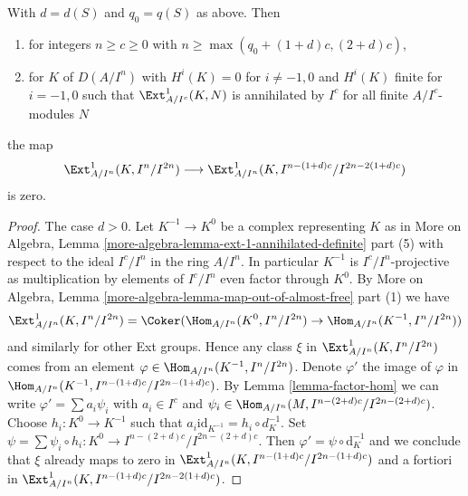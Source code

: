 \begin{lemma}
\label{lemma-bound-two-term-complex}
With $d = d(S)$ and $q_0 = q(S)$ as above. Then
\begin{enumerate}
\item for integers $n \geq c \geq 0$ with
$n \geq \max(q_0 + (1 + d)c, (2 + d)c)$,
\item for $K$ of $D(A/I^n)$ with $H^i(K) = 0$ for $i \not = -1, 0$
and $H^i(K)$ finite for $i = -1, 0$ such that $\Ext^1_{A/I^c}(K, N)$
is annihilated by $I^c$ for all finite $A/I^c$-modules $N$
\end{enumerate}
the map
$$
\Ext^1_{A/I^n}(K, I^n/I^{2n})
\longrightarrow
\Ext^1_{A/I^n}(K, I^{n - (1 + d)c}/I^{2n - 2(1 + d)c})
$$
is zero.
\end{lemma}

\begin{proof}
The case $d > 0$. Let $K^{-1} \to K^0$ be a complex representing $K$ as in
More on Algebra, Lemma \ref{more-algebra-lemma-ext-1-annihilated-definite}
part (5) with respect to the ideal $I^c/I^n$ in the ring $A/I^n$.
In particular $K^{-1}$ is $I^c/I^n$-projective as multiplication
by elements of $I^c/I^n$ even factor through $K^0$. By
More on Algebra, Lemma \ref{more-algebra-lemma-map-out-of-almost-free} part (1)
we have
$$
\Ext^1_{A/I^n}(K, I^n/I^{2n}) =
\Coker(\Hom_{A/I^n}(K^0, I^n/I^{2n}) \to \Hom_{A/I^n}(K^{-1}, I^n/I^{2n}))
$$
and similarly for other Ext groups. Hence any class $\xi$ in
$\Ext^1_{A/I^n}(K, I^n/I^{2n})$
comes from an element $\varphi \in \Hom_{A/I^n}(K^{-1}, I^n/I^{2n})$.
Denote $\varphi'$ the image of $\varphi$ in
$\Hom_{A/I^n}(K^{-1}, I^{n - (1 + d)c}/I^{2n - (1 + d)c})$.
By Lemma \ref{lemma-factor-hom}
we can write $\varphi' = \sum a_i \psi_i$ with $a_i \in I^c$ and
$\psi_i \in \Hom_{A/I^n}(M, I^{n - (2 + d)c}/I^{2n - (2 + d)c})$.
Choose $h_i : K^0 \to K^{-1}$ such that
$a_i \text{id}_{K^{-1}} = h_i \circ d_K^{-1}$. Set
$\psi = \sum \psi_i \circ h_i : K^0 \to I^{n - (2 + d)c}/I^{2n - (2 + d)c}$.
Then $\varphi' = \psi \circ \text{d}_K^{-1}$ and we conclude that
$\xi$ already maps to zero in
$\Ext^1_{A/I^n}(K, I^{n - (1 + d)c}/I^{2n - (1 + d)c})$
and a fortiori in
$\Ext^1_{A/I^n}(K, I^{n - (1 + d)c}/I^{2n - 2(1 + d)c})$.


\end{proof}
